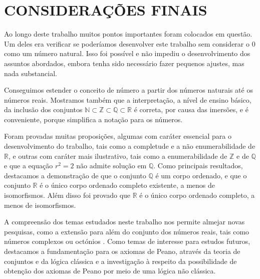 \documentclass[../main.tex]{subfiles}
\begin{document}
\chapter*[Conclusão]{CONSIDERAÇÕES FINAIS}

Ao longo deste trabalho muitos pontos importantes foram colocados em questão. Um deles era verificar se poderíamos desenvolver este trabalho sem considerar o $0$ como um número natural. Isso foi possível e não impediu o desenvolvimento dos assuntos abordados, embora tenha sido necessário fazer pequenos ajustes, mas nada substancial. 

Conseguimos estender o conceito de número a partir dos números naturais até os números reais. Mostramos também que a interpretação, a nível de ensino básico, da inclusão dos conjuntos $\mathbb{N} \subset \mathbb{Z} \subset \mathbb{Q} \subset \mathbb{R}$ é correta, por causa das imersões, e é conveniente, porque simplifica a notação para os números. 

Foram provadas muitas proposições, algumas com caráter essencial para o desenvolvimento do trabalho, tais como a completude e a não enumerabilidade de $\mathbb{R}$, e outras com caráter mais ilustrativo, tais como a enumerabilidade de $\mathbb{Z}$ e de $\mathbb{Q}$ e que a equação $r^2 = 2$ não admite solução em $\mathbb{Q}$. Como principais resultados, destacamos a demonstração de que o conjunto $\mathbb{Q}$ é um corpo ordenado, e que o conjunto $\mathbb{R}$ é o único corpo ordenado completo existente, a menos de isomorfismos. Além disso foi provado que $\mathbb{R}$ é o único corpo ordenado completo, a menos de isomorfismos.

A compreensão dos temas estudados neste trabalho nos permite almejar novas pesquisas, como a extensão para além do conjunto dos números reais, tais como números complexos ou octónios . Como temas de interesse para estudos futuros, destacamos a fundamentação para os axiomas de Peano, através da teoria de conjuntos e da lógica clássica e a investigação à respeito da possibilidade de obtenção dos axiomas de Peano por meio de uma lógica não clássica.
\end{document}
